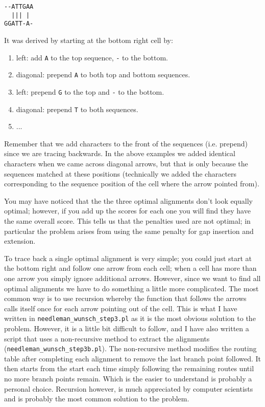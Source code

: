 \documentclass[11pt]{article}
\begin{document}
\begin{spacing}{0.75}
\begin{verbatim}
--ATTGAA
  ||| |
GGATT-A-
\end{verbatim}
\end{spacing}
It was derived by starting at the bottom right cell by:
\begin{enumerate}
\item left: add \texttt{A} to the top sequence, \texttt{-} to the bottom.
\item diagonal: prepend \texttt{A} to both top and bottom sequences. 
\item left: prepend \texttt{G} to the top and \texttt{-} to the bottom.
\item diagonal: prepend \texttt{T} to both sequences.
\item ...
\end{enumerate}
Remember that we add characters to the front of the sequences (i.e. prepend) since
we are tracing backwards. In the above examples we added identical characters when
we came across diagonal arrows, but that is only because the sequences matched at
these positions (technically we added the characters corresponding to the sequence
position of the cell where the arrow pointed from).

You may have noticed that the the three optimal alignments don't look equally optimal;
however, if you add up the scores for each one you will find they have the same overall
score. This tells us that the penalties used are not optimal; in particular the problem
arises from using the same penalty for gap insertion and extension.

To trace back a single optimal alignment is very simple; you could just start at the
bottom right and follow one arrow from each cell; when a cell has more than one
arrow you simply ignore additional arrows. However, since we want to find all optimal alignments
we have to do something a little more complicated. The most common way is to use recursion
whereby the function that follows the arrows calls itself once for each arrow pointing
out of the cell. This is what I have written in \verb|needleman_wunsch_step3.pl| as it is
the most obvious solution to the problem. However, it is a little bit difficult to follow,
and I have also written a script that uses a non-recursive method to extract the
alignments (\verb|needleman_wunsch_step3b.pl|). The non-recursive method modifies
the routing table after completing each alignment to remove the last branch point followed.
It then starts from the start each time simply following the remaining routes until
no more branch points remain. Which is the easier to understand is probably a personal
choice.
Recursion however, is much appreciated by computer scientists and is probably the most common
solution to the problem.
\end{document}
